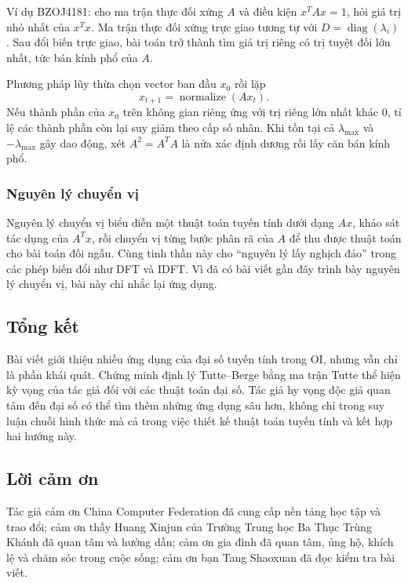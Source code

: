 \documentclass[11pt]{article}
\begin{document}
Ví dụ BZOJ4181: cho ma trận thực đối xứng $A$ và điều kiện $x^TAx=1$, hỏi giá
trị nhỏ nhất của $x^Tx$. Ma trận thực đối xứng trực giao tương tự với
$D=\operatorname{diag}(\lambda_i)$. Sau đổi biến trực giao, bài toán trở thành
tìm giá trị riêng có trị tuyệt đối lớn nhất, tức bán kính phổ của $A$.

Phương pháp lũy thừa chọn vector ban đầu $x_0$ rồi lặp
\[
  x_{t+1}=\operatorname{normalize}(Ax_t).
\]
Nếu thành phần của $x_0$ trên không gian riêng ứng với trị riêng lớn nhất khác
$0$, tỉ lệ các thành phần còn lại suy giảm theo cấp số nhân. Khi tồn tại cả
$\lambda_{\max}$ và $-\lambda_{\max}$ gây dao động, xét $A^2=A^TA$ là nửa xác
định dương rồi lấy căn bán kính phổ.

\subsubsection{Nguyên lý chuyển vị}

Nguyên lý chuyển vị biểu diễn một thuật toán tuyến tính dưới dạng $Ax$, khảo sát
tác dụng của $A^Tx$, rồi chuyển vị từng bước phân rã của $A$ để thu được thuật
toán cho bài toán đối ngẫu. Cùng tinh thần này cho “nguyên lý lấy nghịch đảo”
trong các phép biến đổi như DFT và IDFT. Vì đã có bài viết gần đây trình bày
nguyên lý chuyển vị, bài này chỉ nhắc lại ứng dụng.

\subsection{Tổng kết}

Bài viết giới thiệu nhiều ứng dụng của đại số tuyến tính trong OI, nhưng vẫn chỉ
là phần khái quát. Chứng minh định lý Tutte--Berge bằng ma trận Tutte thể hiện
kỳ vọng của tác giả đối với các thuật toán đại số. Tác giả hy vọng độc giả quan
tâm đến đại số có thể tìm thêm những ứng dụng sâu hơn, không chỉ trong suy luận
chuỗi hình thức mà cả trong việc thiết kế thuật toán tuyến tính và kết hợp hai
hướng này.

\subsection*{Lời cảm ơn}

Tác giả cảm ơn China Computer Federation đã cung cấp nền tảng học tập và trao
đổi; cảm ơn thầy Huang Xinjun của Trường Trung học Ba Thục Trùng Khánh đã quan
tâm và hướng dẫn; cảm ơn gia đình đã quan tâm, ủng hộ, khích lệ và chăm sóc
trong cuộc sống; cảm ơn bạn Tang Shaoxuan đã đọc kiểm tra bài viết.
\end{document}
